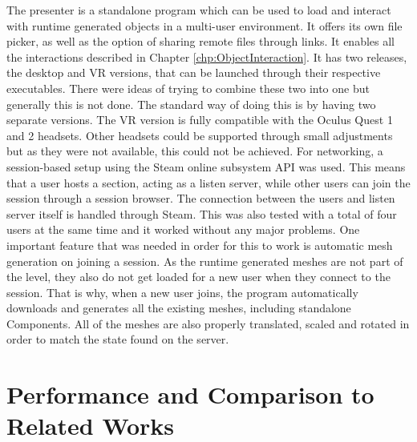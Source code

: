 The presenter is a standalone program which can be used to load and interact with runtime generated objects in a multi-user environment. It offers its own file picker, as well as the option of sharing remote files through links. It enables all the interactions described in Chapter \ref{chp:ObjectInteraction}. It has two releases, the desktop and VR versions, that can be launched through their respective executables. There were ideas of trying to combine these two into one but generally this is not done. The standard way of doing this is by having two separate versions. The VR version is fully compatible with the Oculus Quest 1 and 2 headsets. Other headsets could be supported through small adjustments but as they were not available, this could not be achieved. For networking, a session-based setup using the Steam online subsystem API was used. This means that a user hosts a section, acting as a listen server, while other users can join the session through a session browser. The connection between the users and listen server itself is handled through Steam. This was also tested with a total of four users at the same time and it worked without any major problems. One important feature that was needed in order for this to work is automatic mesh generation on joining a session. As the runtime generated meshes are not part of the level, they also do not get loaded for a new user when they connect to the session. That is why, when a new user joins, the program automatically downloads and generates all the existing meshes, including standalone Components. All of the meshes are also properly translated, scaled and rotated in order to match the state found on the server. 

\section{Performance and Comparison to Related Works}

